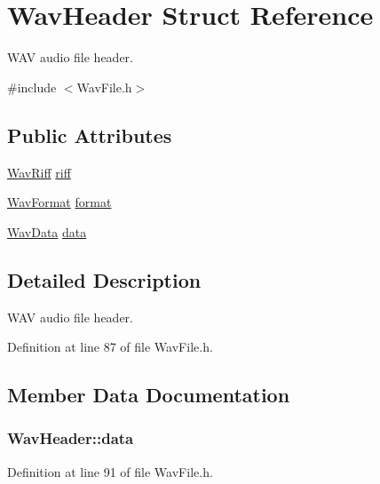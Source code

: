 \hypertarget{struct_wav_header}{}\section{Wav\+Header Struct Reference}
\label{struct_wav_header}


W\+AV audio file header.  




{\ttfamily \#include $<$Wav\+File.\+h$>$}

\subsection*{Public Attributes}
\begin{DoxyCompactItemize}
\item 
\hyperlink{struct_wav_riff}{Wav\+Riff} \hyperlink{struct_wav_header_aacf1b3e3efff56e6edb9a29b666a65c4}{riff}
\item 
\hyperlink{struct_wav_format}{Wav\+Format} \hyperlink{struct_wav_header_a5b193f1dcd7e3621b16ea569554bd118}{format}
\item 
\hyperlink{struct_wav_data}{Wav\+Data} \hyperlink{struct_wav_header_aff83ee86e5b799bffd5540c4d139bb4c}{data}
\end{DoxyCompactItemize}


\subsection{Detailed Description}
W\+AV audio file header. 

Definition at line 87 of file Wav\+File.\+h.



\subsection{Member Data Documentation}
\subsubsection[{\texorpdfstring{data}{data}}]{ Wav\+Header\+::data}\hypertarget{struct_wav_header_aff83ee86e5b799bffd5540c4d139bb4c}{}\label{struct_wav_header_aff83ee86e5b799bffd5540c4d139bb4c}


Definition at line 91 of file Wav\+File.\+h.

